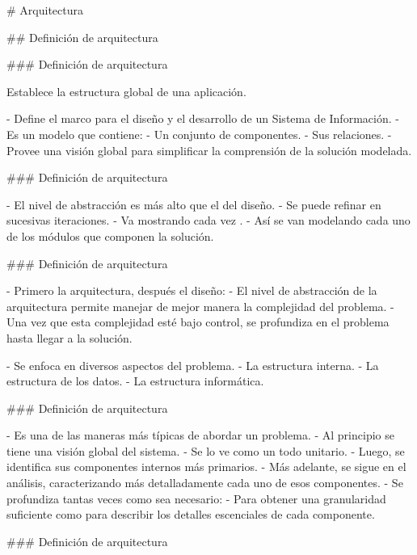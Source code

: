 # Arquitectura

## Definición de arquitectura

### Definición de arquitectura

\vspace{-0.5em}
\buildrboxx{}
Establece la estructura global de una aplicación.
\finishrboxx

- Define el marco para el diseño y el desarrollo de un Sistema de Información.
    - Es un modelo que contiene:
        - Un conjunto de componentes.
        - Sus relaciones.
    - Provee una visión global para simplificar la comprensión de la solución modelada.

### Definición de arquitectura


- El nivel de abstracción es más alto que el del diseño.
- Se puede refinar en sucesivas iteraciones.
    - Va mostrando cada vez .
    - Así se van modelando cada uno de los módulos que componen la solución.

### Definición de arquitectura


- Primero la arquitectura, después el diseño:
    - El nivel de abstracción de la arquitectura permite manejar de mejor manera la complejidad
    del problema.
    - Una vez que esta complejidad esté bajo control, se profundiza en el
    problema hasta llegar a la solución.

- Se enfoca en diversos aspectos del problema.
    - La estructura interna.
    - La estructura de los datos.
    - La estructura informática.

### Definición de arquitectura


- Es una de las maneras más típicas de abordar un problema.
- Al principio se tiene una visión global del sistema.
    - Se lo ve como un todo unitario.
- Luego, se identifica sus componentes internos más primarios.
- Más adelante, se sigue  en el análisis,
caracterizando más detalladamente cada uno de esos componentes.
- Se profundiza tantas veces como sea necesario:
    - Para obtener una granularidad suficiente como para describir los
    detalles escenciales de cada componente.

### Definición de arquitectura

